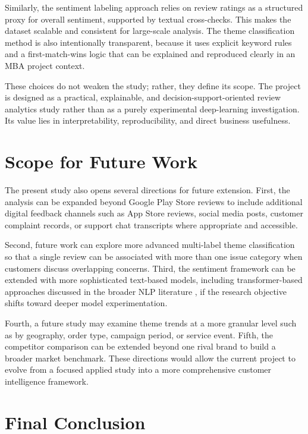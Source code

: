 Similarly, the sentiment labeling approach relies on review ratings as a structured proxy for overall sentiment, supported by textual cross-checks. This makes the dataset scalable and consistent for large-scale analysis. The theme classification method is also intentionally transparent, because it uses explicit keyword rules and a first-match-wins logic that can be explained and reproduced clearly in an MBA project context.

These choices do not weaken the study; rather, they define its scope. The project is designed as a practical, explainable, and decision-support-oriented review analytics study rather than as a purely experimental deep-learning investigation. Its value lies in interpretability, reproducibility, and direct business usefulness.

\section{Scope for Future Work}

The present study also opens several directions for future extension. First, the analysis can be expanded beyond Google Play Store reviews to include additional digital feedback channels such as App Store reviews, social media posts, customer complaint records, or support chat transcripts where appropriate and accessible.

Second, future work can explore more advanced multi-label theme classification so that a single review can be associated with more than one issue category when customers discuss overlapping concerns. Third, the sentiment framework can be extended with more sophisticated text-based models, including transformer-based approaches discussed in the broader NLP literature \cite{devlin2019,jurafsky2024}, if the research objective shifts toward deeper model experimentation.

Fourth, a future study may examine theme trends at a more granular level such as by geography, order type, campaign period, or service event. Fifth, the competitor comparison can be extended beyond one rival brand to build a broader market benchmark. These directions would allow the current project to evolve from a focused applied study into a more comprehensive customer intelligence framework.

\section{Final Conclusion}


